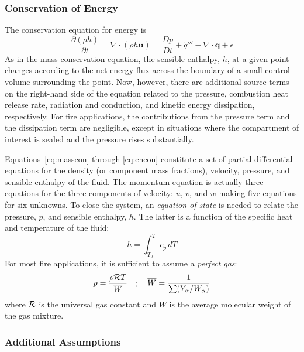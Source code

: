\documentclass[graybox]{svmult}
\begin{document}
\subsubsection{Conservation of Energy}

The conservation equation for energy is
\begin{equation}
\frac{\partial (\rho h)}{\partial t} = \nabla \cdot (\rho h \mathbf{u}) = \frac{Dp}{Dt} + \dot{q}''' - \nabla \cdot \mathbf{q} + \epsilon
\label{eq:encon}
\end{equation}
As in the mass conservation equation, the sensible enthalpy, $h$, at a given point changes according to the net energy flux across the boundary of a small control volume surrounding the point. Now, however, there are additional source terms on the right-hand side of the equation related to the pressure, combustion heat release rate, radiation and conduction, and kinetic energy dissipation, respectively. For fire applications, the contributions from the pressure term and the dissipation term are negligible, except in situations where the compartment of interest is sealed and the pressure rises substantially.

Equations~\ref{eq:masscon} through \ref{eq:encon} constitute a set of partial differential equations for the density (or component mass fractions), velocity, pressure, and sensible enthalpy of the fluid. The momentum equation is actually three equations for the three components of velocity: $u$, $v$, and $w$ making five equations for six unknowns. To close the system, an {\em equation of state} is needed to relate the pressure, $p$, and sensible enthalpy, $h$. The latter is a function of the specific heat and temperature of the fluid:
\begin{equation}
h = \int_{T_0}^T c_p \, dT
\label{eq:hdef}
\end{equation}
For most fire applications, it is sufficient to assume a {\em perfect gas}:
\begin{equation}
p = \frac{\rho {\cal R} T}{\overline{W}} \quad ; \quad \overline{W} = \frac{1}{\sum (Y_\alpha / W_\alpha)}
\label{eq:pgas}
\end{equation}
where ${\cal R}$ is the universal gas constant and $\overline{W}$ is the average molecular weight of the gas mixture.


\subsubsection{Additional Assumptions}
\end{document}
